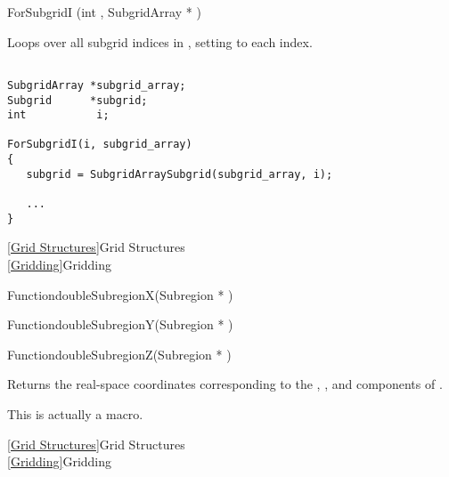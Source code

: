 {\newpage\clearpage
{}%
\begin{defmac} ForSubgridI (int , {SubgridArray *} )
\par
\DESCRIPTION
Loops over all subgrid indices in , setting
 to each index.
\par
\EXAMPLE
\mbox{}
\begin{display}\begin{verbatim}

SubgridArray *subgrid_array;
Subgrid      *subgrid;
int           i;

ForSubgridI(i, subgrid_array)
{
   subgrid = SubgridArraySubgrid(subgrid_array, i);

   ...
}\end{verbatim}
\end{display}
\par
\SEEALSO
\vref{Grid Structures}{Grid Structures}\\
\vref{Gridding}{Gridding}
\par
\end{defmac}%
\lthtmlfigureZ
\lthtmlcheckvsize\clearpage}

{\newpage\clearpage
{}%
\begin{deftypefn}{Function}{double}{SubregionX}({Subregion *} )
\end{deftypefn}%
\lthtmlfigureZ
\lthtmlcheckvsize\clearpage}

{\newpage\clearpage
{}%
\begin{deftypefn}{Function}{double}{SubregionY}({Subregion *} )
\end{deftypefn}%
\lthtmlfigureZ
\lthtmlcheckvsize\clearpage}

{\newpage\clearpage
{}%
\begin{deftypefn}{Function}{double}{SubregionZ}({Subregion *} )
\par
\DESCRIPTION
Returns the real-space coordinates corresponding to the
, , and  components of .
\par
\NOTES
This is actually a macro.
\par
\SEEALSO
\vref{Grid Structures}{Grid Structures}\\
\vref{Gridding}{Gridding}
\par
\end{deftypefn}%
\lthtmlfigureZ
\lthtmlcheckvsize\clearpage}

